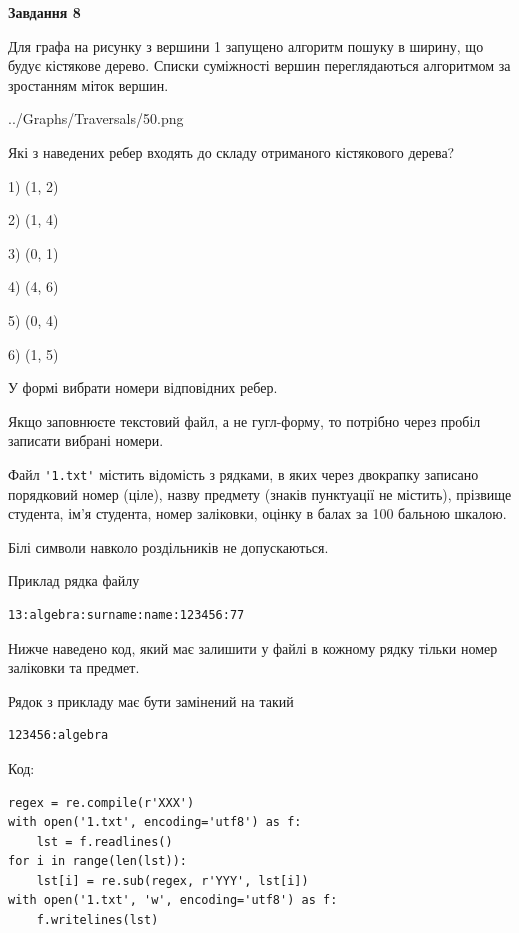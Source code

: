 \documentclass[12pt, ukrainian]{article}
\def\code#1{\Verb!#1!}
\begin{document}
{\begin {large}
{\begin {center}\textbf{Завдання 8}\end {center}}\par
Для графа на рисунку з вершини 1 запущено алгоритм пошуку в ширину, що будує кістякове дерево. Списки суміжності вершин переглядаються алгоритмом за зростанням міток вершин.\par
\begin{center}
	{../Graphs/Traversals/50.png}
\end{center}
\par Які з наведених ребер входять до складу отриманого кістякового дерева?\par
1) (1, 2)\par
2) (1, 4)\par
3) (0, 1)\par
4) (4, 6)\par
5) (0, 4)\par
6) (1, 5)\par
{\vskip 15pt} У формі вибрати номери відповідних ребер.


Якщо заповнюєте текстовий файл, а не гугл-форму, то потрібно через пробіл записа\-ти вибрані номери.\par
\newpage


Файл \code{'1.txt'} містить відомість з рядками, в яких через двокрапку записано поряд\-ковий номер (ціле), назву предмету (знаків пунктуації не містить), прізвище студента, ім'я студента, номер заліковки, оцінку в балах за 100 бальною шкалою.

Білі символи навколо роздільників не допускаються.

Приклад рядка файлу



\begin{verbatim}
13:algebra:surname:name:123456:77
\end{verbatim}


Нижче наведено код, який має залишити у файлі в кожному рядку тільки номер заліковки та предмет.

Рядок з прикладу має бути замінений на такий



\begin{verbatim}
123456:algebra
\end{verbatim}




Код:



\begin{verbatim}
regex = re.compile(r'XXX')
with open('1.txt', encoding='utf8') as f:
    lst = f.readlines()
for i in range(len(lst)):
    lst[i] = re.sub(regex, r'YYY', lst[i])
with open('1.txt', 'w', encoding='utf8') as f:
    f.writelines(lst)
\end{verbatim}







\end{large}}
\end{document}
